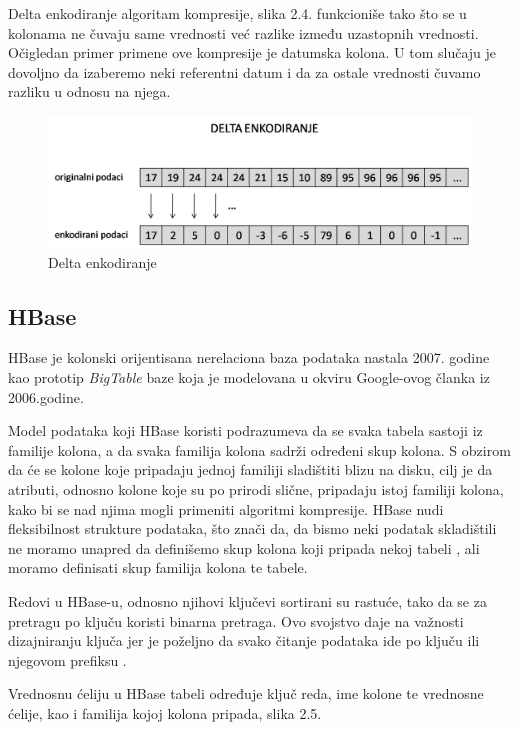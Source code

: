 \documentclass[12pt,oneside]{memoir}
\begin{document}
Delta enkodiranje algoritam kompresije, slika 2.4. funkcioniše tako što se u kolonama ne čuvaju same vrednosti već razlike između uzastopnih vrednosti. Očigledan primer primene ove kompresije je datumska kolona. U tom slučaju  je dovoljno da izaberemo neki referentni datum i da za ostale vrednosti čuvamo razliku u odnosu na njega.

\begin{figure}[!ht]
  \centering
  \includegraphics[width=1\textwidth]{delta-encoding.png}
  \caption{Delta enkodiranje}
  \label{fig:grafikon}
\end{figure}

\subsection{HBase}

HBase je kolonski orijentisana nerelaciona baza podataka nastala 2007. godine kao prototip \textit{BigTable} baze koja je modelovana u okviru Google-ovog članka iz 2006.godine\cite{BigTable}. 

Model podataka koji HBase koristi podrazumeva da se svaka tabela sastoji iz familije kolona, a da svaka familija kolona sadrži određeni skup kolona.  S obzirom da će se kolone koje pripadaju jednoj familiji sladištiti blizu na disku, cilj je da atributi, odnosno kolone koje su po prirodi slične, pripadaju istoj familiji kolona, kako bi se nad njima mogli primeniti algoritmi kompresije. HBase nudi fleksibilnost strukture podataka, što znači da, da bismo neki podatak skladištili ne moramo unapred da definišemo skup kolona koji pripada nekoj tabeli , ali moramo definisati skup familija kolona te tabele.

Redovi u HBase-u, odnosno njihovi ključevi sortirani su rastuće, tako da se za pretragu po ključu koristi binarna pretraga. Ovo svojstvo daje na važnosti dizajniranju ključa jer je poželjno da svako čitanje podataka ide po ključu ili njegovom prefiksu \cite{hbaseSchema}. 

Vrednosnu ćeliju u HBase tabeli određuje ključ reda, ime kolone te vrednosne ćelije, kao i familija kojoj kolona pripada, slika 2.5.
\end{document}
